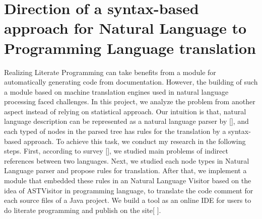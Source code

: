 \section{Direction of  a syntax-based approach for Natural Language to Programming Language translation}
Realizing Literate Programming can take benefits from a module for automatically generating code from documentation. However, the building of such a module based on machine translation engines used in natural language processing faced challenges. In this project, we analyze the problem from another aspect instead of relying on statistical approach. Our intuition is that, natural language description can be represented as a natural language parser by [\cite{P13-1045}], and each typed of nodes in the parsed tree has rules for the translation by a syntax-based approach. To achieve this task, we conduct my research in the following steps.  First, according to survey [\cite{Pulido-Prieto:2017:SNP:3145473.3109481}], we studied main problems of indirect references between two languages. Next, we studied each node types in Natural Language parser and propose rules for translation. After that, we implement a module that embedded these rules in an Natural Language Visitor based on the idea of ASTVisitor in programming language, to translate the code comment for each source files of a Java project. We build a tool as an online IDE for users to do literate programming and publish on the site[ \cite{NLPLWebTool}]. 









